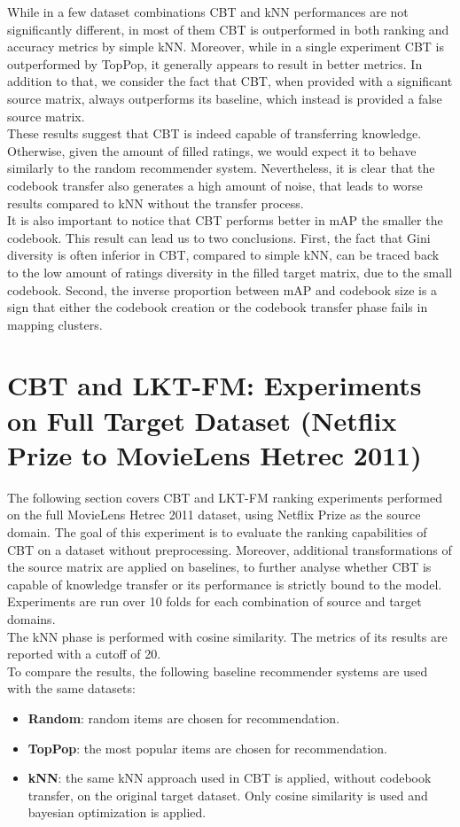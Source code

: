 While in a few dataset combinations CBT and kNN performances are not significantly different, in most of them CBT is outperformed in both ranking and accuracy metrics by simple kNN. Moreover, while in a single experiment CBT is outperformed by TopPop, it generally appears to result in better metrics. In addition to that, we consider the fact that CBT, when provided with a significant source matrix, always outperforms its baseline, which instead is provided a false source matrix.\\
These results suggest that CBT is indeed capable of transferring knowledge. Otherwise, given the amount of filled ratings, we would expect it to behave similarly to the random recommender system. Nevertheless, it is clear that the codebook transfer also generates a high amount of noise, that leads to worse results compared to kNN without the transfer process.\\
It is also important to notice that CBT performs better in mAP the smaller the codebook. This result can lead us to two conclusions. First, the fact that Gini diversity is often inferior in CBT, compared to simple kNN, can be traced back to the low amount of ratings diversity in the filled target matrix, due to the small codebook. Second, the inverse proportion between mAP and codebook size is a sign that either the codebook creation or the codebook transfer phase fails in mapping clusters.

\clearpage



\section{CBT and LKT-FM: Experiments on Full Target Dataset (Netflix Prize to MovieLens Hetrec 2011)}

The following section covers CBT and LKT-FM ranking experiments performed on the full MovieLens Hetrec 2011 dataset, using Netflix Prize as the source domain. The goal of this experiment is to evaluate the ranking capabilities of CBT on a dataset without preprocessing. Moreover, additional transformations of the source matrix are applied on baselines, to further analyse whether CBT is capable of knowledge transfer or its performance is strictly bound to the model.\\
Experiments are run over 10 folds for each combination of source and target domains.\\
The kNN phase is performed with cosine similarity. The metrics of its results are reported with a cutoff of 20.\\
To compare the results, the following baseline recommender systems are used with the same datasets:
\begin{itemize}
\item \textbf{Random}: random items are chosen for recommendation.
\item \textbf{TopPop}: the most popular items are chosen for recommendation.
\item \textbf{kNN}: the same kNN approach used in CBT is applied, without codebook transfer, on the original target dataset. Only cosine similarity is used and bayesian optimization is applied.
\end{itemize}


